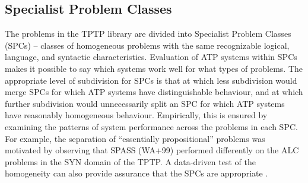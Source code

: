 \documentclass[runningheads]{llncs}
\begin{document}
\subsection{Specialist Problem Classes}
\label{SPCs}

The problems in the TPTP library are divided into Specialist Problem Classes (SPCs) -- classes of 
homogeneous problems with the same recognizable logical, language, and syntactic characteristics.
Evaluation of ATP systems within SPCs makes it possible to say which systems work well for what 
types of problems. 
The appropriate level of subdivision for SPCs is that at which less subdivision would merge 
SPCs for which ATP systems have distinguishable behaviour, and at which further subdivision
would unnecessarily split an SPC for which ATP systems have reasonably homogeneous behaviour.
Empirically, this is ensured by examining the patterns of system performance across the 
problems in each SPC. 
For example, the separation of ``essentially propositional'' problems was motivated by observing 
that SPASS (WA+99) performed differently on the ALC problems in the SYN domain of the TPTP.
A data-driven test of the homogeneity can also provide assurance that the SPCs are
appropriate \cite{FS02}.
\end{document}
